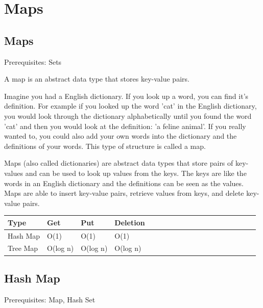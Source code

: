 \documentclass[11pt,oneside]{book}
\begin{document}
    \chapter{ Maps }
        \section{ Maps }
        

Prerequisites: Sets

A map is an abstract data type that stores key-value pairs.

Imagine you had a English dictionary. If you look up a word, you can find it's definition. For example if you looked up the word 'cat' in the English dictionary, you would look through the dictionary alphabetically until you found the word 'cat' and then you would look at the definition: 'a feline animal'. If you really wanted to, you could also add your own words into the dictionary and the definitions of your words. This type of structure is called a map.

Maps (also called dictionaries) are abstract data types that store pairs of key-values and can be used to look up values from the keys. The keys are like the words in an English dictionary and the definitions can be seen as the values. Maps are able to insert key-value pairs, retrieve values from keys, and delete key-value pairs.


        

\begin{center}\begin{tabulary}{0.4\linewidth}{|l|l|l|l|l|l|l|l|l|l|l|l|l|l|l|l|l|l|l}\hline


  Type &
  Get &
  Put &
  Deletion\\
\hline


  Hash Map &
  O(1) &
  O(1) &
  O(1)\\

  Tree Map &
  O(log n) &
  O(log n) &
  O(log n)\\

\hline\end{tabulary}\end{center}


        \section{ Hash Map }
        

Prerequisites: Map, Hash Set
\end{document}
